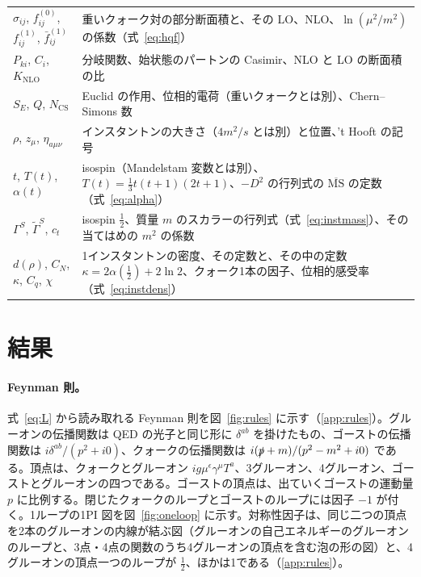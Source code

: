 \documentclass[a4paper,10pt]{ltjsarticle}
\newcommand{\MSbar}{\overline{\mathrm{MS}}}
\begin{document}
\begin{table}[tbp]
\begin{tabularx}{\linewidth}{>{\raggedright\arraybackslash}p{3.9cm}X}
$\hat\sigma_{ij}$, $f^{(0)}_{ij}$, $f^{(1)}_{ij}$, $\bar f^{(1)}_{ij}$ & 重いクォーク対の部分断面積と、その LO、NLO、$\ln(\mu^2/m^2)$ の係数（式~\eqref{eq:hqf}） \\
$P_{ki}$, $C_i$, $K_{\mathrm{NLO}}$ & 分岐関数、始状態のパートンの Casimir、NLO と LO の断面積の比 \\
\midrule
$S_E$, $Q$, $N_{\mathrm{CS}}$ & Euclid の作用、位相的電荷（重いクォークとは別）、Chern--Simons 数 \\
$\rho$, $z_\mu$, $\eta_{a\mu\nu}$ & インスタントンの大きさ（$4m^2/s$ とは別）と位置、't Hooft の記号 \\
$t$, $T(t)$, $\alpha(t)$ & isospin（Mandelstam 変数とは別）、$T(t)=\frac13t(t+1)(2t+1)$、$-D^2$ の行列式の $\MSbar$ の定数（式~\eqref{eq:alpha}） \\
$\Gamma^S$, $\tilde\Gamma^S$, $c_t$ & isospin $\frac12$、質量 $m$ のスカラーの行列式（式~\eqref{eq:instmass}）、その当てはめの $m^2$ の係数 \\
$d(\rho)$, $C_N$, $\kappa$, $C_q$, $\chi$ & 1インスタントンの密度、その定数と、その中の定数 $\kappa=2\alpha(\frac12)+2\ln2$、クォーク1本の因子、位相的感受率（式~\eqref{eq:instdens}） \\
\bottomrule
\end{tabularx}
\end{table}

\section{結果}\label{sec:results}

\paragraph{Feynman 則。}式~\eqref{eq:L} から読み取れる Feynman 則を図~\ref{fig:rules} に示す（\ref{app:rules}）。グルーオンの伝播関数は QED の光子と同じ形に $\delta^{ab}$ を掛けたもの、ゴーストの伝播関数は $i\delta^{ab}/(p^2+i0)$、クォークの伝播関数は $i(\slashed p+m)/(p^2-m^2+i0)$ である。頂点は、クォークとグルーオン $ig\mu^\epsilon\gamma^\mu T^a$、3グルーオン、4グルーオン、ゴーストとグルーオンの四つである。ゴーストの頂点は、出ていくゴーストの運動量 $p$ に比例する。閉じたクォークのループとゴーストのループには因子 $-1$ が付く。1ループの1PI 図を図~\ref{fig:oneloop} に示す。対称性因子は、同じ二つの頂点を2本のグルーオンの内線が結ぶ図（グルーオンの自己エネルギーのグルーオンのループと、3点・4点の関数のうち4グルーオンの頂点を含む泡の形の図）と、4グルーオンの頂点一つのループが $\frac12$、ほかは1である（\ref{app:rules}）。
\end{document}
